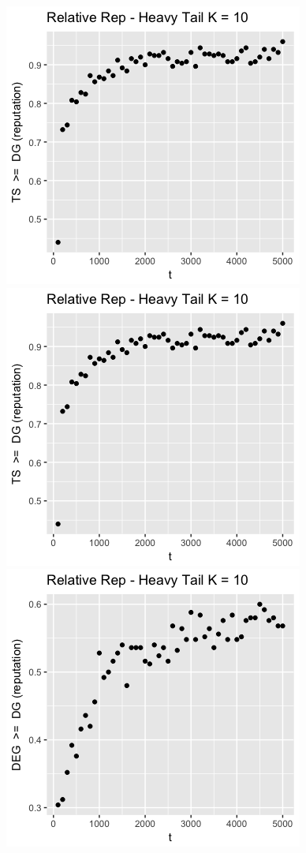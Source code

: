 \documentclass[11pt,letterpaper]{article}
\begin{document}
\includegraphics[scale=0.5]{ts_dg_ht_prelim_10} \\
\includegraphics[scale=0.5]{ts_deg_ht_10_prelim} \\
\includegraphics[scale=0.4]{deg_dg_ht_10_prelim} \\
\end{document}

